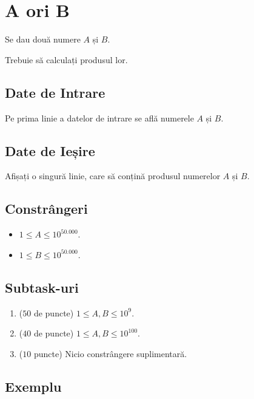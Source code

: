 \documentclass[12pt,a4paper]{article}
\begin{document}


\section*{A ori B}

Se dau două numere $A$ și $B$.

Trebuie să calculați produsul lor.


\subsection*{Date de Intrare}


Pe prima linie a datelor de intrare se află numerele $A$ și $B$.

\subsection*{Date de Ieșire}

Afișați o singură linie, care să conțină produsul numerelor $A$ și $B$.

\subsection*{Constrângeri}

\begin{itemize}
    \item $1 \leq A \leq 10^{50.000}$.
    \item $1 \leq B \leq 10^{50.000}$.
\end{itemize}


\subsection*{Subtask-uri}

\begin{enumerate}
    \item ($50$ de puncte) $1 \leq A, B \leq 10^{9}$.
    \item ($40$ de puncte) $1 \leq A, B \leq 10^{100}$.
    \item ($10$ puncte) Nicio constrângere suplimentară.
\end{enumerate}

\subsection*{Exemplu}
\end{document}
